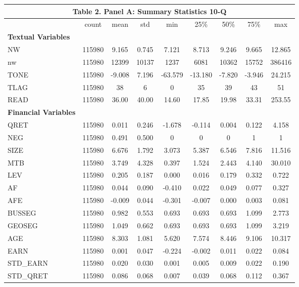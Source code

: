 \begin{table}[htbp] \label{T2PA}
  \centering
    \begin{tabular}{lcccccccc}
    \multicolumn{9}{c}{\textbf{Table 2. Panel A: Summary Statistics 10-Q}} \\
    \midrule
    \midrule
      & count & mean & std & min & 25\% & 50\% & 75\% & max \\
    \midrule
    \textbf{Textual Variables} &   &   &   &   &   &   &   &  \\
    NW & 115980 & 9.165 & 0.745 & 7.121 & 8.713 & 9.246 & 9.665 & 12.865 \\
    nw & 115980 & 12399 & 10137 & 1237 & 6081 & 10362 & 15752 & 386416 \\
    TONE & 115980 & -9.008 & 7.196 & -63.579 & -13.180 & -7.820 & -3.946 & 24.215 \\
    TLAG & 115980 & 38 & 6 & 0 & 35 & 39 & 43 & 51 \\
    READ & 115980 & 36.00 & 40.00 & 14.60 & 17.85 & 19.98 & 33.31 & 253.55 \\
    \textbf{Financial Variables} &   &   &   &   &   &   &   &  \\
    QRET & 115980 & 0.011 & 0.246 & -1.678 & -0.114 & 0.004 & 0.122 & 4.158 \\
    NEG & 115980 & 0.491 & 0.500 & 0 & 0 & 0 & 1 & 1 \\
    SIZE & 115980 & 6.676 & 1.792 & 3.073 & 5.387 & 6.546 & 7.816 & 11.516 \\
    MTB & 115980 & 3.749 & 4.328 & 0.397 & 1.524 & 2.443 & 4.140 & 30.010 \\
    LEV & 115980 & 0.205 & 0.187 & 0.000 & 0.016 & 0.179 & 0.332 & 0.722 \\
    AF & 115980 & 0.044 & 0.090 & -0.410 & 0.022 & 0.049 & 0.077 & 0.327 \\
    AFE & 115980 & -0.009 & 0.044 & -0.301 & -0.007 & 0.000 & 0.003 & 0.081 \\
    BUSSEG & 115980 & 0.982 & 0.553 & 0.693 & 0.693 & 0.693 & 1.099 & 2.773 \\
    GEOSEG & 115980 & 1.049 & 0.662 & 0.693 & 0.693 & 0.693 & 1.099 & 3.219 \\
    AGE & 115980 & 8.303 & 1.081 & 5.620 & 7.574 & 8.446 & 9.106 & 10.317 \\
    EARN & 115980 & 0.001 & 0.047 & -0.224 & -0.002 & 0.011 & 0.022 & 0.084 \\
    STD\_EARN & 115980 & 0.020 & 0.030 & 0.001 & 0.005 & 0.009 & 0.022 & 0.190 \\
    STD\_QRET & 115980 & 0.086 & 0.068 & 0.007 & 0.039 & 0.068 & 0.112 & 0.367 \\
    \bottomrule
    \bottomrule
    \end{tabular}%
\end{table}%
